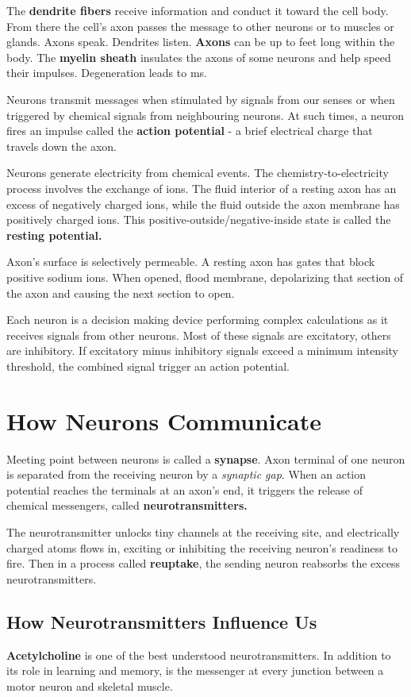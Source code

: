 The \textbf{dendrite fibers} receive information and conduct it toward the cell body. From there the cell's axon passes the message to other neurons or to muscles or glands. Axons speak. Dendrites listen. \textbf{Axons} can be up to feet long within the body. The \textbf{myelin sheath} insulates the axons of some neurons and help speed their impulses. Degeneration leads to ms.

Neurons transmit messages when stimulated by signals from our senses or when triggered by chemical signals from neighbouring neurons. At such times, a neuron fires an impulse called the \textbf{action potential} - a brief electrical charge that travels down the axon.

Neurons generate electricity from chemical events. The chemistry-to-electricity process involves the exchange of ions. The fluid interior of a resting axon has an excess of negatively charged ions, while the fluid outside the axon membrane has positively charged ions. This positive-outside/negative-inside state is called the \textbf{resting potential.}

Axon's surface is selectively permeable. A resting axon has gates that block positive sodium ions. When opened, flood membrane, depolarizing that section of the axon and causing the next section to open.

Each neuron is a decision making device performing complex calculations as it receives signals from other neurons. Most of these signals are excitatory, others are inhibitory. If excitatory minus inhibitory signals exceed a minimum intensity threshold, the combined signal trigger an action potential.

\section*{How Neurons Communicate}
Meeting point between neurons is called a \textbf{synapse}. Axon terminal of one neuron is separated from the receiving neuron by a \textit{synaptic gap}. When an action potential reaches the terminals at an axon's end, it triggers the release of chemical messengers, called \textbf{neurotransmitters.}

The neurotransmitter unlocks tiny channels at the receiving site, and electrically charged atoms flows in, exciting or inhibiting the receiving neuron's readiness to fire. Then in a process called \textbf{reuptake}, the sending neuron reabsorbs the excess neurotransmitters.

\subsection*{How Neurotransmitters Influence Us}
\textbf{Acetylcholine} is one of the best understood neurotransmitters. In addition to its role in learning and memory, is the messenger at every junction between a motor neuron and skeletal muscle. 

